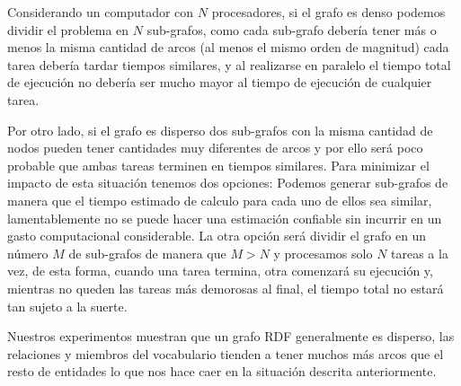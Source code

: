 Considerando un computador con $N$ procesadores, si el grafo es denso podemos
dividir el problema en $N$ sub-grafos, como cada sub-grafo debería tener más o
menos la misma cantidad de arcos (al menos el mismo orden de magnitud)
cada tarea debería tardar tiempos similares, y al realizarse en paralelo el
tiempo total de ejecución no debería ser mucho mayor al tiempo de ejecución de
cualquier tarea.

Por otro lado, si el grafo es disperso dos sub-grafos con la misma cantidad de
nodos pueden tener cantidades muy diferentes de arcos y por ello será poco
probable que ambas tareas terminen en tiempos similares. Para minimizar el
impacto de esta situación tenemos dos opciones: Podemos generar sub-grafos de
manera que el tiempo estimado de calculo para cada uno de ellos sea similar,
lamentablemente no se puede hacer una estimación confiable sin incurrir en un
gasto computacional considerable. La otra opción será dividir el grafo en un
número $M$ de sub-grafos de manera que $M > N$ y procesamos solo $N$ tareas a la
vez, de esta forma, cuando una tarea termina, otra comenzará su ejecución y,
mientras no queden las tareas más demorosas al final, el tiempo total no estará
tan sujeto a la suerte.



Nuestros experimentos muestran que un grafo RDF generalmente es disperso, las
relaciones y miembros del vocabulario tienden a tener muchos más arcos que el
resto de entidades lo que nos hace caer en la situación descrita anteriormente.
